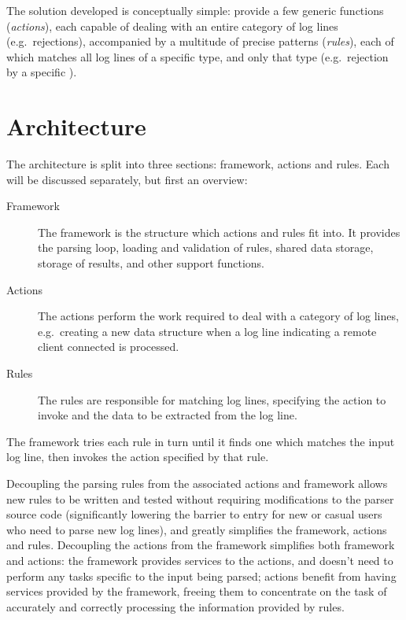 \documentclass[draft]{svmult}
\begin{document}
The solution developed is conceptually simple: provide a few generic
functions (\textit{actions\/}), each capable of dealing with an entire
category of log lines (e.g.\ rejections), accompanied by a multitude of
precise patterns (\textit{rules\/}), each of which matches all log lines of
a specific type, and only that type (e.g.\ rejection by a specific
\DNSBL{}).


\section{Architecture}

\label{Architecture}

The architecture is split into three sections: framework, actions and
rules.  Each will be discussed separately, but first an overview:

\begin{description}

    \item [Framework]  The framework is the structure which actions and
        rules fit into.  It provides the parsing loop, loading and
        validation of rules, shared data storage, storage of results, and
        other support functions.

    \item [Actions]  The actions perform the work required to deal with a
        category of log lines, e.g.\ creating a new data structure when a
        log line indicating a remote client connected is processed.

    \item [Rules]  The rules are responsible for matching log lines,
        specifying the action to invoke and the data to be extracted from
        the log line.

\end{description}

The framework tries each rule in turn until it finds one which matches the
input log line, then invokes the action specified by that rule.

Decoupling the parsing rules from the associated actions and framework
allows new rules to be written and tested without requiring modifications
to the parser source code (significantly lowering the barrier to entry for
new or casual users who need to parse new log lines), and greatly
simplifies the framework, actions and rules. Decoupling the actions from
the framework simplifies both framework and actions: the framework provides
services to the actions, and doesn't need to perform any tasks specific to
the input being parsed; actions benefit from having services provided by
the framework, freeing them to concentrate on the task of accurately and
correctly processing the information provided by rules.
\end{document}
